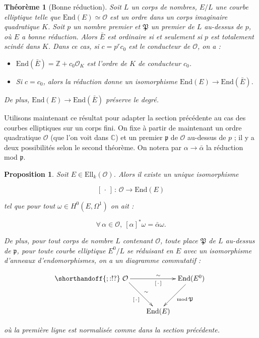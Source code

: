 \documentclass[11pt,a4paper]{article}
\newcommand{\Z}{\mathbb{Z}}
\newcommand{\C}{\mathbb{C}}
\renewcommand{\O}{\mathcal{O}}
\newcommand{\vers}{\longrightarrow}
\newcommand{\End}{\mathrm{End}}
\newcommand{\Ell}{\mathrm{Ell}}
\renewcommand{\frak}{\mathfrak}
\newcommand{\de}{\,:\,}
\newtheorem*{thm}{Théorème}
\newtheorem*{prop}{Proposition}
\theoremstyle{definition}
\begin{document}
\begin{thm}[Bonne réduction]

Soit $L$ un corps de nombres, $E/L$ une courbe elliptique telle que $\End(E)\simeq \O$ est un ordre dans un corps imaginaire quadratique $K$. Soit $p$ un nombre premier et $\frak P$ un premier de $L$ au-dessus de $p$, où $E$ a bonne réduction. Alors $\bar{E}$ est ordinaire si et seulement si $p$ est totalement scindé dans $K$. Dans ce cas, si $c=p^r c_0$ est le conducteur de $\O$, on a :

\begin{itemize}
\item[(i)] $\End(\bar{E})=\Z+c_0 \O_K$ est l'ordre de $K$ de conducteur $c_0$.
\item[(ii)] Si $c=c_0$, alors la réduction donne un isomorphisme $\End(E)\vers\End(\bar{E})$.
\end{itemize}

De plus, $\End(E)\vers\End(\bar{E})$ préserve le degré.

\end{thm}

Utilisons maintenant ce résultat pour adapter la section précédente au cas des courbes elliptiques sur un corps fini. On fixe à partir de maintenant un ordre quadratique $\O$ (que l'on voit dans $\C$) et un premier $\frak p$ de $\O$ au-dessus de $p$ ; il y a deux possibilités selon le second théorème. On notera par $\alpha\vers\bar{\alpha}$ la réduction mod $\frak p$.


\begin{prop}

Soit $E\in \Ell_k(\O)$. Alors il existe un unique isomorphisme

$$[\,\cdot\,] \de \O \vers \End(E)$$

tel que pour tout $\omega \in H^0(E,\Omega^1)$ on ait :

$$\forall \, \alpha \in \O,\ [\alpha]^* \omega = \bar{\alpha}\omega.$$

De plus, pour tout corps de nombre $L$ contenant $\O$, toute place $\frak P$ de $L$ au-dessus de $\frak p$, pour toute courbe elliptique $E^0/L$ se réduisant en $E$ avec un isomorphisme d'anneaux d'endomorphismes, on a un diagramme commutatif :

$$
\shorthandoff{;:!?}
\xymatrix @!=8mm {
\O \ar[rr]^\sim_{[\,\cdot\,]} \ar[rd]^\sim_{[\,\cdot\,]} & & \End(E^0) \ar[ld]^{\mathrm{mod}\,\frak P} \\
 & \End(E) & 
}
$$

où la première ligne est normalisée comme dans la section précédente.

\end{prop}
\end{document}
